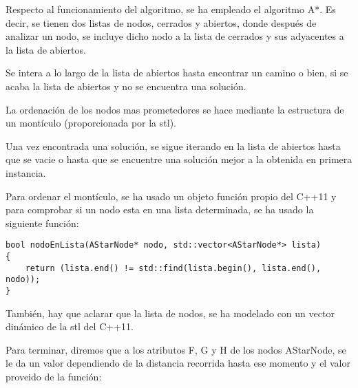 Respecto al funcionamiento del algoritmo, se ha empleado el algoritmo A*.
Es decir, se tienen dos listas de nodos, cerrados y abiertos, donde
después de analizar un nodo, se incluye dicho nodo a la lista de cerrados
y sus adyacentes a la lista de abiertos.

Se intera a lo largo de la lista de abiertos hasta encontrar un camino o bien,
si se acaba la lista de abiertos y no se encuentra una solución.

La ordenación de los nodos mas prometedores se hace mediante la estructura de un
montículo (proporcionada por la stl).

Una vez encontrada una solución, se sigue iterando en la lista de abiertos hasta
que se vacie o hasta que se encuentre una solución mejor a la obtenida en
primera instancia.

Para ordenar el montículo, se ha usado un objeto función propio del C++11 y
para comprobar si un nodo esta en una lista determinada, se ha usado la siguiente
función:

\lstset{language=C++, texcl=true}
\begin{lstlisting}[frame=single]
bool nodoEnLista(AStarNode* nodo, std::vector<AStarNode*> lista)
{
    return (lista.end() != std::find(lista.begin(), lista.end(), nodo));
}
\end{lstlisting}

También, hay que aclarar que la lista de nodos, se ha modelado con un vector
dinámico de la stl del C++11.

Para terminar, diremos que a los atributos F, G y H de los nodos AStarNode,
se le da un valor dependiendo de la distancia recorrida hasta ese momento
y el valor proveido de la función:

